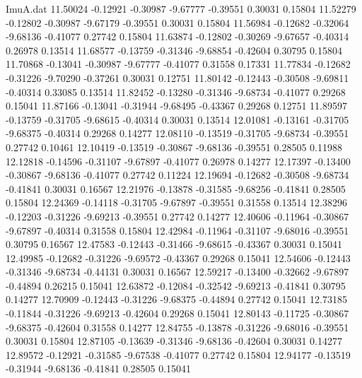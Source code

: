\begin{filecontents}{ImuA.dat}
  11.50024   -0.12921   -0.30987   -9.67777   -0.39551    0.30031    0.15804
  11.52279   -0.12802   -0.30987   -9.67179   -0.39551    0.30031    0.15804
  11.56984   -0.12682   -0.32064   -9.68136   -0.41077    0.27742    0.15804
  11.63874   -0.12802   -0.30269   -9.67657   -0.40314    0.26978    0.13514
  11.68577   -0.13759   -0.31346   -9.68854   -0.42604    0.30795    0.15804
  11.70868   -0.13041   -0.30987   -9.67777   -0.41077    0.31558    0.17331
  11.77834   -0.12682   -0.31226   -9.70290   -0.37261    0.30031    0.12751
  11.80142   -0.12443   -0.30508   -9.69811   -0.40314    0.33085    0.13514
  11.82452   -0.13280   -0.31346   -9.68734   -0.41077    0.29268    0.15041
  11.87166   -0.13041   -0.31944   -9.68495   -0.43367    0.29268    0.12751
  11.89597   -0.13759   -0.31705   -9.68615   -0.40314    0.30031    0.13514
  12.01081   -0.13161   -0.31705   -9.68375   -0.40314    0.29268    0.14277
  12.08110   -0.13519   -0.31705   -9.68734   -0.39551    0.27742    0.10461
  12.10419   -0.13519   -0.30867   -9.68136   -0.39551    0.28505    0.11988
  12.12818   -0.14596   -0.31107   -9.67897   -0.41077    0.26978    0.14277
  12.17397   -0.13400   -0.30867   -9.68136   -0.41077    0.27742    0.11224
  12.19694   -0.12682   -0.30508   -9.68734   -0.41841    0.30031    0.16567
  12.21976   -0.13878   -0.31585   -9.68256   -0.41841    0.28505    0.15804
  12.24369   -0.14118   -0.31705   -9.67897   -0.39551    0.31558    0.13514
  12.38296   -0.12203   -0.31226   -9.69213   -0.39551    0.27742    0.14277
  12.40606   -0.11964   -0.30867   -9.67897   -0.40314    0.31558    0.15804
  12.42984   -0.11964   -0.31107   -9.68016   -0.39551    0.30795    0.16567
  12.47583   -0.12443   -0.31466   -9.68615   -0.43367    0.30031    0.15041
  12.49985   -0.12682   -0.31226   -9.69572   -0.43367    0.29268    0.15041
  12.54606   -0.12443   -0.31346   -9.68734   -0.44131    0.30031    0.16567
  12.59217   -0.13400   -0.32662   -9.67897   -0.44894    0.26215    0.15041
  12.63872   -0.12084   -0.32542   -9.69213   -0.41841    0.30795    0.14277
  12.70909   -0.12443   -0.31226   -9.68375   -0.44894    0.27742    0.15041
  12.73185   -0.11844   -0.31226   -9.69213   -0.42604    0.29268    0.15041
  12.80143   -0.11725   -0.30867   -9.68375   -0.42604    0.31558    0.14277
  12.84755   -0.13878   -0.31226   -9.68016   -0.39551    0.30031    0.15804
  12.87105   -0.13639   -0.31346   -9.68136   -0.42604    0.30031    0.14277
  12.89572   -0.12921   -0.31585   -9.67538   -0.41077    0.27742    0.15804
  12.94177   -0.13519   -0.31944   -9.68136   -0.41841    0.28505    0.15041

\end{filecontents}
